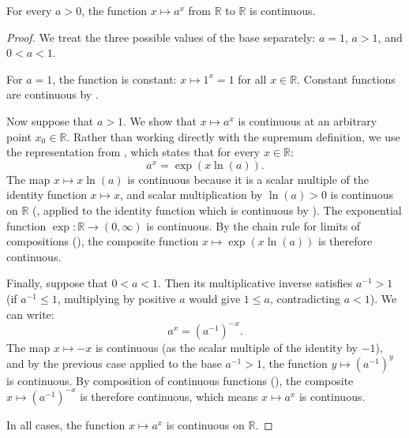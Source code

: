 \begin{proposition} \label{proposition:real_exponentiation_of_a_real_number_base_is_a_continuous_function}
    For every $a > 0$, the function $x \mapsto a^x$ from $\mathbb{R}$ to $\mathbb{R}$ is continuous.
\end{proposition}
\begin{proof}
    We treat the three possible values of the base separately: $a = 1$, $a > 1$, and $0 < a < 1$.

    For $a = 1$, the function is constant: $x \mapsto 1^x = 1$ for all $x \in \mathbb{R}$. Constant functions are continuous by .

    Now suppose that $a > 1$. We show that $x \mapsto a^x$ is continuous at an arbitrary point $x_0 \in \mathbb{R}$. Rather than working directly with the supremum definition, we use the representation from , which states that for every $x \in \mathbb{R}$:
    $$a^x = \exp(x \ln(a)).$$
    The map $x \mapsto x \ln(a)$ is continuous because it is a scalar multiple of the identity function $x \mapsto x$, and scalar multiplication by $\ln(a) > 0$ is continuous on $\mathbb{R}$ (, applied to the identity function which is continuous by ). The exponential function $\exp : \mathbb{R} \to (0, \infty)$ is continuous. By the chain rule for limits of compositions (), the composite function $x \mapsto \exp(x \ln(a))$ is therefore continuous.

    Finally, suppose that $0 < a < 1$. Then its multiplicative inverse satisfies $a^{-1} > 1$ (if $a^{-1} \leq 1$, multiplying by positive $a$ would give $1 \leq a$, contradicting $a < 1$). We can write:
    $$a^x = \left(a^{-1}\right)^{-x}.$$
    The map $x \mapsto -x$ is continuous (as the scalar multiple of the identity by $-1$), and by the previous case applied to the base $a^{-1} > 1$, the function $y \mapsto (a^{-1})^y$ is continuous. By composition of continuous functions (), the composite $x \mapsto (a^{-1})^{-x}$ is therefore continuous, which means $x \mapsto a^x$ is continuous.

    In all cases, the function $x \mapsto a^x$ is continuous on $\mathbb{R}$.
\end{proof}